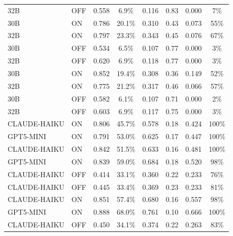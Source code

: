 \begin{table}[t]
\begin{tabular}{llcccccc}
32B & OFF & 0.558 & 6.9\% & 0.116 & 0.83 & 0.000 & 7\% \\
30B & ON  & 0.786 & 20.1\% & 0.310 & 0.43 & 0.073 & 55\% \\
32B & ON  & 0.797 & 23.3\% & 0.343 & 0.45 & 0.076 & 67\% \\
30B & OFF & 0.534 & 6.5\% & 0.107 & 0.77 & 0.000 & 3\% \\
32B & OFF & 0.620 & 6.9\% & 0.118 & 0.77 & 0.000 & 3\% \\
30B & ON  & 0.852 & 19.4\% & 0.308 & 0.36 & 0.149 & 52\% \\
32B & ON  & 0.775 & 21.2\% & 0.317 & 0.46 & 0.066 & 57\% \\
30B & OFF & 0.582 & 6.1\% & 0.107 & 0.71 & 0.000 & 2\% \\
32B & OFF & 0.603 & 6.9\% & 0.117 & 0.75 & 0.000 & 3\% \\
CLAUDE-HAIKU & ON  & 0.806 & 45.7\% & 0.578 & 0.18 & 0.424 & 100\% \\
GPT5-MINI & ON  & 0.791 & 53.0\% & 0.625 & 0.17 & 0.447 & 100\% \\
CLAUDE-HAIKU & ON  & 0.842 & 51.5\% & 0.633 & 0.16 & 0.481 & 100\% \\
GPT5-MINI & ON  & 0.839 & 59.0\% & 0.684 & 0.18 & 0.520 & 98\% \\
CLAUDE-HAIKU & OFF & 0.414 & 33.1\% & 0.360 & 0.22 & 0.233 & 76\% \\
CLAUDE-HAIKU & OFF & 0.445 & 33.4\% & 0.369 & 0.23 & 0.233 & 81\% \\
CLAUDE-HAIKU & ON  & 0.851 & 57.4\% & 0.680 & 0.16 & 0.557 & 98\% \\
GPT5-MINI & ON  & 0.888 & 68.0\% & 0.761 & 0.10 & 0.666 & 100\% \\
CLAUDE-HAIKU & OFF & 0.450 & 34.1\% & 0.374 & 0.22 & 0.263 & 83\% \\
\bottomrule
\end{tabular}
\end{table}




